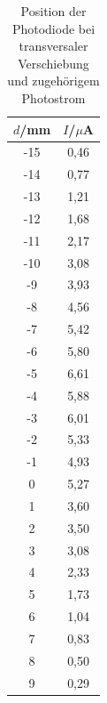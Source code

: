 \begin{table}[H]
	\begin{center}
		\begin{tabular}{c c}
			\toprule
			\(d\)/mm & \(I\)/\(\mu\)A \\
			\midrule
			-15  &  0,46\\                                                                                            
			-14     &0,77\\                                                                                          
			-13     &1,21\\                                                                                        
			-12     &1,68\\                                                                                      
			-11     &2,17\\                                                                                    
			-10     &3,08\\                                                                                  
			-9      &3,93\\                                                                               
			-8      &4,56\\                                                                             
			-7      &5,42\\
			-6      &5,80\\                                                                         
			-5      &6,61\\                                                                       
			-4      &5,88\\                                                                     
			-3      &6,01\\                                                                   
			-2      &5,33\\
			-1      &4,93\\
			0       &5,27\\
			1       &3,60\\
			2       &3,50\\
			3       &3,08\\
			4       &2,33\\
			5       &1,73\\
			6       &1,04\\
			7       &0,83\\
			8       &0,50\\
			9       &0,29\\
			\bottomrule
		\end{tabular}
		\caption{Position der Photodiode bei transversaler Verschiebung und zugehörigem Photostrom}
		\label{tab:t5}
	\end{center}
\end{table}

